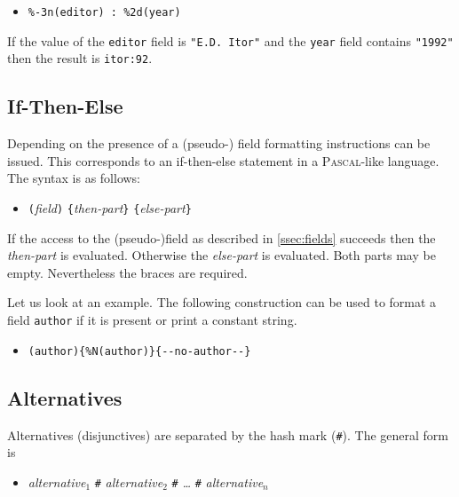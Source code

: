 \documentclass[11pt,a4paper]{scrbook}
\begin{document}
\begin{itemize}
\item [] \texttt{\%-3n(editor) : \%2d(year)} 
\end{itemize}

If the value of the \texttt{editor} field is \verb|"|\verb|E.D. Itor"| and the
\texttt{year} field contains \texttt{"1992"} then the result is
\texttt{itor:92}.

\subsection{If-Then-Else}\label{ssec:if-then-else}

Depending on the presence of a (pseudo-) field formatting instructions can be
issued. This corresponds to an if-then-else statement in a
\textsc{Pascal}-like language. The syntax is as follows:

\begin{itemize}
  \item [] \verb|(|\textit{field}\/\verb|)|
           \verb|{|\textit{then-part}\/\verb|}|
           \verb|{|\textit{else-part}\/\verb|}|
\end{itemize}

If the access to the (pseudo-)field as described in \ref{ssec:fields} succeeds
then the \textit{then-part} is evaluated. Otherwise the \textit{else-part} is
evaluated. Both parts may be empty. Nevertheless the braces are required.

Let us look at an example. The following construction can be used to format a
field \texttt{author} if it is present or print a constant string.

\begin{itemize}
\item [] \verb|(author){|\texttt{\%}\verb|N(author)}{--no-author--}|
\end{itemize}


\subsection{Alternatives}

Alternatives (disjunctives) are separated by the hash mark (\verb|#|). The
general form is

\begin{itemize}
\item [] \textit{alternative\(_1\)} \verb|#|
         \textit{alternative\(_2\)} \verb|#| 
         \textit{\dots}             \verb|#|
         \textit{alternative\(_n\)}
\end{itemize}
\end{document}
